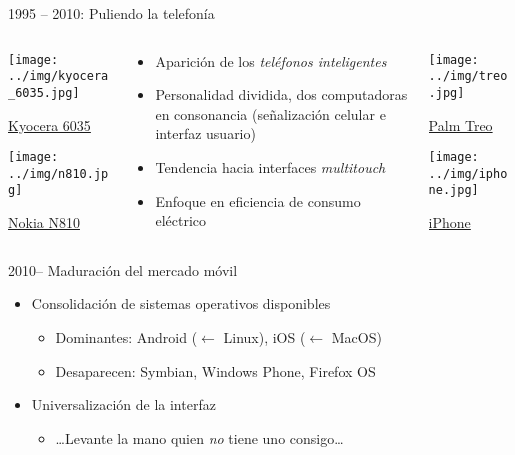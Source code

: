 \documentclass[presentation]{beamer}
\begin{document}
\begin{frame}[label={sec:orgdfab061}]{1995 – 2010: Puliendo la telefonía}
\begin{columns} \begin{column}{0.15\textwidth}
\begin{center}
\texttt{[image: ../img/kyocera\_6035.jpg]}
\end{center}
{\tiny \href{https://en.wikipedia.org/wiki/Kyocera_6035#/media/File:Kyocera6035.jpg}{Kyocera 6035}}
\begin{center}
\texttt{[image: ../img/n810.jpg]}
\end{center}
{\tiny \href{https://en.wikipedia.org/wiki/Nokia_N810#/media/File:N810-open.jpg}{Nokia N810}}
\end{column} \begin{column}{0.6\textwidth}
\begin{itemize}
\item Aparición de los \emph{teléfonos inteligentes}
\item Personalidad dividida, dos computadoras en consonancia (señalización
celular e interfaz usuario)
\item Tendencia hacia interfaces \emph{multitouch}
\item Enfoque en eficiencia de consumo eléctrico
\end{itemize}
\end{column} \begin{column}{0.15\textwidth}
\begin{center}
\texttt{[image: ../img/treo.jpg]}
\end{center}
{\tiny \href{https://es.wikipedia.org/wiki/Treo#/media/File:Treo680sp.jpg}{Palm Treo}}
\begin{center}
\texttt{[image: ../img/iphone.jpg]}
\end{center}
{\tiny \href{https://en.wikipedia.org/wiki/IPhone_3G}{iPhone}}
\end{column} \end{columns}
\end{frame}

\begin{frame}[label={sec:org5d1cfe8}]{2010– Maduración del mercado móvil}
\begin{itemize}
\item Consolidación de sistemas operativos disponibles
\begin{itemize}
\item Dominantes: Android (\(\leftarrow\) Linux), iOS (\(\leftarrow\) MacOS)
\item Desaparecen: Symbian, Windows Phone, Firefox OS
\end{itemize}
\item Universalización de la interfaz
\begin{itemize}
\item \ldots{}Levante la mano quien \emph{no} tiene uno consigo\ldots{}
\end{itemize}
\end{itemize}
\end{frame}
\end{document}
